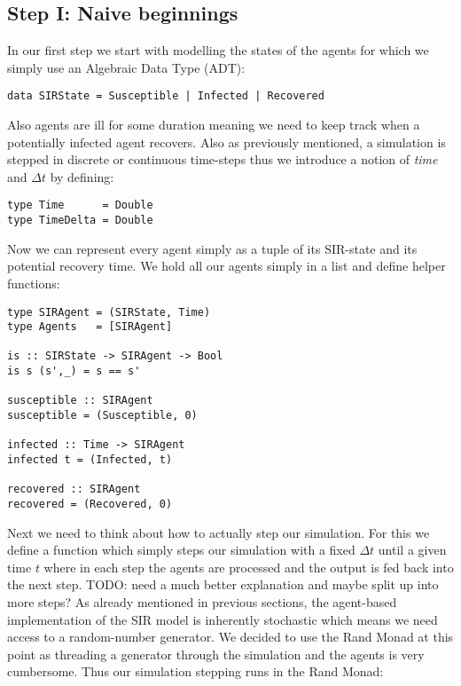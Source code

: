 \subsection*{Step I: Naive beginnings}
In our first step we start with modelling the states of the agents for which we simply use an Algebraic Data Type (ADT):

\begin{verbatim}
data SIRState = Susceptible | Infected | Recovered
\end{verbatim}

Also agents are ill for some duration meaning we need to keep track when a potentially infected agent recovers. Also as previously mentioned, a simulation is stepped in discrete or continuous time-steps thus we introduce a notion of \textit{time} and $\Delta t$ by defining:

\begin{verbatim}
type Time      = Double
type TimeDelta = Double
\end{verbatim}

Now we can represent every agent simply as a tuple of its SIR-state and its potential recovery time. We hold all our agents simply in a list and define helper functions:
\begin{verbatim}
type SIRAgent = (SIRState, Time)
type Agents   = [SIRAgent]

is :: SIRState -> SIRAgent -> Bool
is s (s',_) = s == s'

susceptible :: SIRAgent
susceptible = (Susceptible, 0)

infected :: Time -> SIRAgent
infected t = (Infected, t)

recovered :: SIRAgent
recovered = (Recovered, 0)
\end{verbatim}

Next we need to think about how to actually step our simulation. For this we define a function which simply steps our simulation with a fixed $\Delta t$ until a given time $t$ where in each step the agents are processed and the output is fed back into the next step.
TODO: need a much better explanation and maybe split up into more steps?
As already mentioned in previous sections, the agent-based implementation of the SIR model is inherently stochastic which means we need access to a random-number generator. We decided to use the Rand Monad at this point as threading a generator through the simulation and the agents is very cumbersome. Thus our simulation stepping runs in the Rand Monad:


